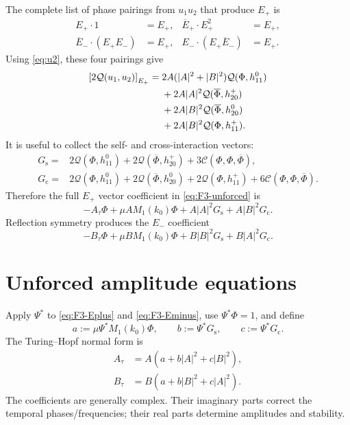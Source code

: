 \documentclass[11pt]{article}
\newcommand{\cQ}{\mathcal{Q}}
\newcommand{\cC}{\mathcal{C}}
\begin{document}
The complete list of phase pairings from $u_1u_2$ that produce $E_+$ is
\begin{align*}
E_+\cdot1&=E_+,
&\overline E_+\cdot E_+^2&=E_+,\\
\overline E_-\cdot(E_+E_-)&=E_+,
&E_-\cdot(E_+\overline E_-)&=E_+.
\end{align*}
Using \eqref{eq:u2}, these four pairings give
\begin{align}
\left[2\cQ(u_1,u_2)\right]_{E_+}
={}&2A(|A|^2+|B|^2)\cQ(\Phi,h_{11}^{0})\notag\\
&+2A|A|^2\cQ(\overline\Phi,h_{20}^{+})\notag\\
&+2A|B|^2\cQ(\overline\Phi,h_{20}^{0})\notag\\
&+2A|B|^2\cQ(\Phi,h_{11}^{+}).
\label{eq:Q-feedback-resonant}
\end{align}
It is useful to collect the self- and cross-interaction vectors:
\begin{subequations}
\label{eq:G-vectors}
\begin{align}
G_{\mathrm{s}}={}&
  2\cQ(\Phi,h_{11}^{0})
 +2\cQ(\overline\Phi,h_{20}^{+})
 +3\cC(\Phi,\Phi,\overline\Phi),
\label{eq:Gs}\\
G_{\mathrm{c}}={}&
  2\cQ(\Phi,h_{11}^{0})
 +2\cQ(\overline\Phi,h_{20}^{0})
 +2\cQ(\Phi,h_{11}^{+})
 +6\cC(\Phi,\Phi,\overline\Phi).
\label{eq:Gc}
\end{align}
\end{subequations}
Therefore the full $E_+$ vector coefficient in \eqref{eq:F3-unforced} is
\begin{equation}
  -A_\tau\Phi+\mu A M_1(k_0)\Phi
  +A|A|^2G_{\mathrm{s}}+A|B|^2G_{\mathrm{c}}.
  \label{eq:F3-Eplus}
\end{equation}
Reflection symmetry produces the $E_-$ coefficient
\begin{equation}
  -B_\tau\Phi+\mu B M_1(k_0)\Phi
  +B|B|^2G_{\mathrm{s}}+B|A|^2G_{\mathrm{c}}.
  \label{eq:F3-Eminus}
\end{equation}

\section{Unforced amplitude equations}
\label{sec:normal-form}

Apply $\Psi^*$ to \eqref{eq:F3-Eplus} and
\eqref{eq:F3-Eminus}, use $\Psi^*\Phi=1$, and define
\begin{equation}
  a:=\mu\Psi^*M_1(k_0)\Phi,
  \qquad
  b:=\Psi^*G_{\mathrm{s}},
  \qquad
  c:=\Psi^*G_{\mathrm{c}}.
  \label{eq:abc}
\end{equation}
The Turing--Hopf normal form is
\begin{subequations}
\label{eq:normal-form}
\begin{align}
  A_\tau&=A\left(a+b|A|^2+c|B|^2\right),
  \label{eq:A-normal}\\
  B_\tau&=B\left(a+b|B|^2+c|A|^2\right).
  \label{eq:B-normal}
\end{align}
\end{subequations}
The coefficients are generally complex.  Their imaginary parts correct the
temporal phases/frequencies; their real parts determine amplitudes and
stability.
\end{document}
